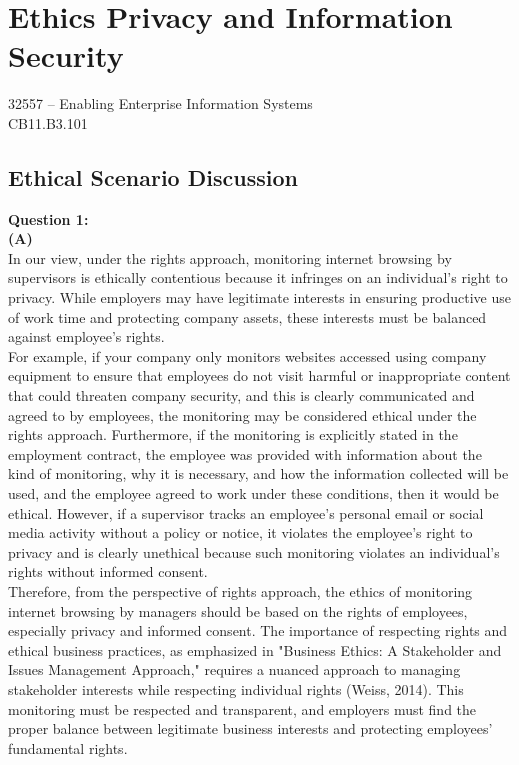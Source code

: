 \documentclass[12pt,a4paper]{article}
\begin{document}
\maketitle

\section*{Ethics Privacy and Information Security}
32557 – Enabling Enterprise Information Systems\\
CB11.B3.101

\subsection*{Ethical Scenario Discussion}
\textbf{Question 1:}\\[0.2cm]
\textbf{(A)}\\[-0.4cm]

\noindent In our view, under the rights approach, monitoring internet browsing by supervisors is ethically contentious because it infringes on an individual’s right to privacy. While employers may have legitimate interests in ensuring productive use of work time and protecting company assets, these interests must be balanced against employee’s rights.\\

\noindent For example, if your company only monitors websites accessed using company equipment to ensure that employees do not visit harmful or inappropriate content that could threaten company security, and this is clearly communicated and agreed to by employees, the monitoring may be considered ethical under the rights approach. Furthermore, if the monitoring is explicitly stated in the employment contract, the employee was provided with information about the kind of monitoring, why it is necessary, and how the information collected will be used, and the employee agreed to work under these conditions, then it would be ethical. However, if a supervisor tracks an employee's personal email or social media activity without a policy or notice, it violates the employee's right to privacy and is clearly unethical because such monitoring violates an individual's rights without informed consent.\\  
 
\noindent Therefore, from the perspective of rights approach, the ethics of monitoring internet browsing by managers should be based on the rights of employees, especially privacy and informed consent. The importance of respecting rights and ethical business practices, as emphasized in "Business Ethics: A Stakeholder and Issues Management Approach," requires a nuanced approach to managing stakeholder interests while respecting individual rights (Weiss, 2014). This monitoring must be respected and transparent, and employers must find the proper balance between legitimate business interests and protecting employees' fundamental rights.\\ 
\end{document}
